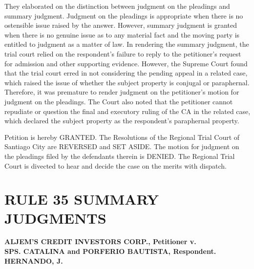\documentclass[
12pt,
oneside,
onehalfspacing,
headsepline
]{DigestCollection}
\begin{document}
They elaborated on the distinction between judgment on the pleadings and summary judgment. Judgment on the pleadings is appropriate when there is no ostensible issue raised by the answer. However, summary judgment is granted when there is no genuine issue as to any material fact and the moving party is entitled to judgment as a matter of law. In rendering the summary judgment, the trial court relied on the respondent's failure to reply to the petitioner's request for admission and other supporting evidence. However, the Supreme Court found that the trial court erred in not considering the pending appeal in a related case, which raised the issue of whether the subject property is conjugal or paraphernal. Therefore, it was premature to render judgment on the petitioner's motion for judgment on the pleadings. The Court also noted that the petitioner cannot repudiate or question the final and executory ruling of the CA in the related case, which declared the subject property as the respondent's paraphernal property.

Petition is hereby GRANTED. The Resolutions of the Regional Trial Court of Santiago City are REVERSED and SET ASIDE. The motion for judgment on the pleadings filed by the defendants therein is DENIED. The Regional Trial Court is divected to hear and decide the case on the merits with dispatch.

\chapter{RULE 35 SUMMARY JUDGMENTS}
\label{a0dc86e0-0a16-11ef-932c-63c852f65e48}


\label{f8183e50-0a29-11ef-a1a5-03b0bde1fccf}


\noindent\textbf{ALJEM’S CREDIT INVESTORS CORP., Petitioner v. \\SPS. CATALINA and PORFERIO BAUTISTA, Respondent. HERNANDO, J.}\vspace{0.4cm}
\end{document}
